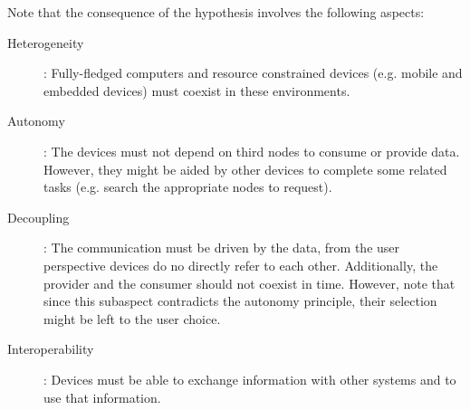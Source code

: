 Note that the consequence of the hypothesis involves the following aspects:
\begin{description}
  \item[Heterogeneity]: Fully-fledged computers and resource constrained devices (e.g. mobile and embedded devices) must coexist in these environments.
  \item[Autonomy]: The devices must not depend on third nodes to consume or provide data.
                   However, they might be aided by other devices to complete some related tasks (e.g. search the appropriate nodes to request).
  \item[Decoupling]: The communication must be driven by the data, from the user perspective devices do no directly refer to each other.
		    Additionally, the provider and the consumer should not coexist in time.
		    However, note that since this subaspect contradicts the autonomy principle, their selection might be left to the user choice.
  \item[Interoperability]: Devices must be able to exchange information with other systems and to use that information. %
\end{description}